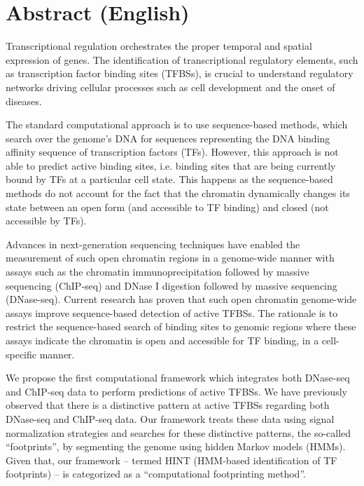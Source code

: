 \chapter*{Abstract (English)}

Transcriptional regulation orchestrates the proper temporal and spatial expression of genes. The identification of transcriptional regulatory elements, such as transcription factor binding sites (TFBSs), is crucial to understand regulatory networks driving cellular processes such as cell development and the onset of diseases. 

The standard computational approach is to use sequence-based methods, which search over the genome's DNA for sequences representing the DNA binding affinity sequence of transcription factors (TFs). However, this approach is not able to predict active binding sites, i.e. binding sites that are being currently bound by TFs at a particular cell state. This happens as the sequence-based methods do not account for the fact that the chromatin dynamically changes its state between an open form (and accessible to TF binding) and closed (not accessible by TFs).

Advances in next-generation sequencing techniques have enabled the measurement of such open chromatin regions in a genome-wide manner with assays such as the chromatin immunoprecipitation followed by massive sequencing (ChIP-seq) and DNase I digestion followed by massive sequencing (DNase-seq). Current research has proven that such open chromatin genome-wide assays improve sequence-based detection of active TFBSs. The rationale is to restrict the sequence-based search of binding sites to genomic regions where these assays indicate the chromatin is open and accessible for TF binding, in a cell-specific manner.

We propose the first computational framework which integrates both DNase-seq and ChIP-seq data to perform predictions of active TFBSs. We have previously observed that there is a distinctive pattern at active TFBSs regarding both DNase-seq and ChIP-seq data. Our framework treats these data using signal normalization strategies and searches for these distinctive patterns, the so-called ``footprints'', by segmenting the genome using hidden Markov models (HMMs). Given that, our framework -- termed HINT (HMM-based identification of TF footprints) -- is categorized as a ``computational footprinting method''.

